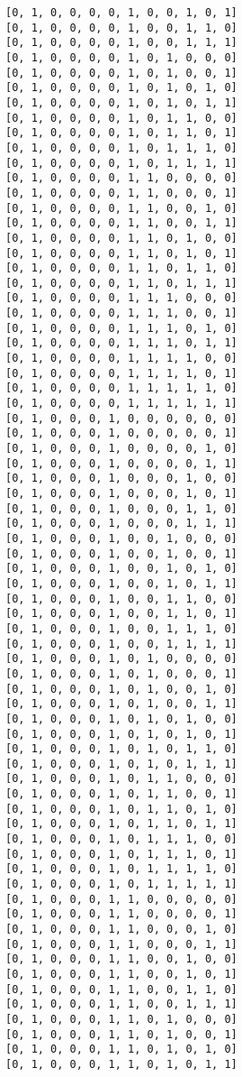 \documentclass[11pt]{article}
\begin{document}
\begin{Verbatim}[commandchars=\\\{\}]
[0, 1, 0, 0, 0, 0, 1, 0, 0, 1, 0, 1]
[0, 1, 0, 0, 0, 0, 1, 0, 0, 1, 1, 0]
[0, 1, 0, 0, 0, 0, 1, 0, 0, 1, 1, 1]
[0, 1, 0, 0, 0, 0, 1, 0, 1, 0, 0, 0]
[0, 1, 0, 0, 0, 0, 1, 0, 1, 0, 0, 1]
[0, 1, 0, 0, 0, 0, 1, 0, 1, 0, 1, 0]
[0, 1, 0, 0, 0, 0, 1, 0, 1, 0, 1, 1]
[0, 1, 0, 0, 0, 0, 1, 0, 1, 1, 0, 0]
[0, 1, 0, 0, 0, 0, 1, 0, 1, 1, 0, 1]
[0, 1, 0, 0, 0, 0, 1, 0, 1, 1, 1, 0]
[0, 1, 0, 0, 0, 0, 1, 0, 1, 1, 1, 1]
[0, 1, 0, 0, 0, 0, 1, 1, 0, 0, 0, 0]
[0, 1, 0, 0, 0, 0, 1, 1, 0, 0, 0, 1]
[0, 1, 0, 0, 0, 0, 1, 1, 0, 0, 1, 0]
[0, 1, 0, 0, 0, 0, 1, 1, 0, 0, 1, 1]
[0, 1, 0, 0, 0, 0, 1, 1, 0, 1, 0, 0]
[0, 1, 0, 0, 0, 0, 1, 1, 0, 1, 0, 1]
[0, 1, 0, 0, 0, 0, 1, 1, 0, 1, 1, 0]
[0, 1, 0, 0, 0, 0, 1, 1, 0, 1, 1, 1]
[0, 1, 0, 0, 0, 0, 1, 1, 1, 0, 0, 0]
[0, 1, 0, 0, 0, 0, 1, 1, 1, 0, 0, 1]
[0, 1, 0, 0, 0, 0, 1, 1, 1, 0, 1, 0]
[0, 1, 0, 0, 0, 0, 1, 1, 1, 0, 1, 1]
[0, 1, 0, 0, 0, 0, 1, 1, 1, 1, 0, 0]
[0, 1, 0, 0, 0, 0, 1, 1, 1, 1, 0, 1]
[0, 1, 0, 0, 0, 0, 1, 1, 1, 1, 1, 0]
[0, 1, 0, 0, 0, 0, 1, 1, 1, 1, 1, 1]
[0, 1, 0, 0, 0, 1, 0, 0, 0, 0, 0, 0]
[0, 1, 0, 0, 0, 1, 0, 0, 0, 0, 0, 1]
[0, 1, 0, 0, 0, 1, 0, 0, 0, 0, 1, 0]
[0, 1, 0, 0, 0, 1, 0, 0, 0, 0, 1, 1]
[0, 1, 0, 0, 0, 1, 0, 0, 0, 1, 0, 0]
[0, 1, 0, 0, 0, 1, 0, 0, 0, 1, 0, 1]
[0, 1, 0, 0, 0, 1, 0, 0, 0, 1, 1, 0]
[0, 1, 0, 0, 0, 1, 0, 0, 0, 1, 1, 1]
[0, 1, 0, 0, 0, 1, 0, 0, 1, 0, 0, 0]
[0, 1, 0, 0, 0, 1, 0, 0, 1, 0, 0, 1]
[0, 1, 0, 0, 0, 1, 0, 0, 1, 0, 1, 0]
[0, 1, 0, 0, 0, 1, 0, 0, 1, 0, 1, 1]
[0, 1, 0, 0, 0, 1, 0, 0, 1, 1, 0, 0]
[0, 1, 0, 0, 0, 1, 0, 0, 1, 1, 0, 1]
[0, 1, 0, 0, 0, 1, 0, 0, 1, 1, 1, 0]
[0, 1, 0, 0, 0, 1, 0, 0, 1, 1, 1, 1]
[0, 1, 0, 0, 0, 1, 0, 1, 0, 0, 0, 0]
[0, 1, 0, 0, 0, 1, 0, 1, 0, 0, 0, 1]
[0, 1, 0, 0, 0, 1, 0, 1, 0, 0, 1, 0]
[0, 1, 0, 0, 0, 1, 0, 1, 0, 0, 1, 1]
[0, 1, 0, 0, 0, 1, 0, 1, 0, 1, 0, 0]
[0, 1, 0, 0, 0, 1, 0, 1, 0, 1, 0, 1]
[0, 1, 0, 0, 0, 1, 0, 1, 0, 1, 1, 0]
[0, 1, 0, 0, 0, 1, 0, 1, 0, 1, 1, 1]
[0, 1, 0, 0, 0, 1, 0, 1, 1, 0, 0, 0]
[0, 1, 0, 0, 0, 1, 0, 1, 1, 0, 0, 1]
[0, 1, 0, 0, 0, 1, 0, 1, 1, 0, 1, 0]
[0, 1, 0, 0, 0, 1, 0, 1, 1, 0, 1, 1]
[0, 1, 0, 0, 0, 1, 0, 1, 1, 1, 0, 0]
[0, 1, 0, 0, 0, 1, 0, 1, 1, 1, 0, 1]
[0, 1, 0, 0, 0, 1, 0, 1, 1, 1, 1, 0]
[0, 1, 0, 0, 0, 1, 0, 1, 1, 1, 1, 1]
[0, 1, 0, 0, 0, 1, 1, 0, 0, 0, 0, 0]
[0, 1, 0, 0, 0, 1, 1, 0, 0, 0, 0, 1]
[0, 1, 0, 0, 0, 1, 1, 0, 0, 0, 1, 0]
[0, 1, 0, 0, 0, 1, 1, 0, 0, 0, 1, 1]
[0, 1, 0, 0, 0, 1, 1, 0, 0, 1, 0, 0]
[0, 1, 0, 0, 0, 1, 1, 0, 0, 1, 0, 1]
[0, 1, 0, 0, 0, 1, 1, 0, 0, 1, 1, 0]
[0, 1, 0, 0, 0, 1, 1, 0, 0, 1, 1, 1]
[0, 1, 0, 0, 0, 1, 1, 0, 1, 0, 0, 0]
[0, 1, 0, 0, 0, 1, 1, 0, 1, 0, 0, 1]
[0, 1, 0, 0, 0, 1, 1, 0, 1, 0, 1, 0]
[0, 1, 0, 0, 0, 1, 1, 0, 1, 0, 1, 1]

\end{Verbatim}
\end{document}
